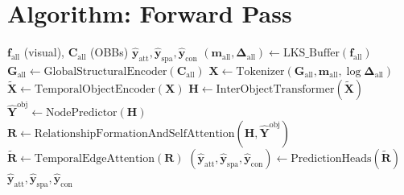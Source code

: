 \documentclass{article}
\newcommand{\mat}[1]{\bm{#1}}
\begin{document}
\section{Algorithm: Forward Pass}
\label{sec:algorithm}

\begin{algorithm}[h]
\caption{W-DsgDetr Forward Pass}
\begin{algorithmic}[1]
\Require $\mat{f}_{\text{all}}$ (visual), $\mat{C}_{\text{all}}$ (OBBs)
\Ensure $\hat{\mat{y}}_{\text{att}}, \hat{\mat{y}}_{\text{spa}}, \hat{\mat{y}}_{\text{con}}$
\State $(\mat{m}_{\text{all}}, \bm{\Delta}_{\text{all}}) \gets \text{LKS\_Buffer}(\mat{f}_{\text{all}})$
\State $\mat{G}_{\text{all}} \gets \text{GlobalStructuralEncoder}(\mat{C}_{\text{all}})$
\State $\mat{X} \gets \text{Tokenizer}(\mat{G}_{\text{all}}, \mat{m}_{\text{all}}, \log \bm{\Delta}_{\text{all}})$
\State $\tilde{\mat{X}} \gets \text{TemporalObjectEncoder}(\mat{X})$ 
\State $\mat{H} \gets \text{InterObjectTransformer}(\tilde{\mat{X}})$
\State $\hat{\mat{Y}}^{\text{obj}} \gets \text{NodePredictor}(\mat{H})$
\State $\mat{R} \gets \text{RelationshipFormationAndSelfAttention}(\mat{H}, \hat{\mat{Y}}^{\text{obj}})$
\State $\tilde{\mat{R}} \gets \text{TemporalEdgeAttention}(\mat{R})$
\State $(\hat{\mat{y}}_{\text{att}}, \hat{\mat{y}}_{\text{spa}}, \hat{\mat{y}}_{\text{con}}) \gets \text{PredictionHeads}(\tilde{\mat{R}})$
\State \Return $\hat{\mat{y}}_{\text{att}}, \hat{\mat{y}}_{\text{spa}}, \hat{\mat{y}}_{\text{con}}$
\end{algorithmic}
\end{algorithm}
\end{document}
